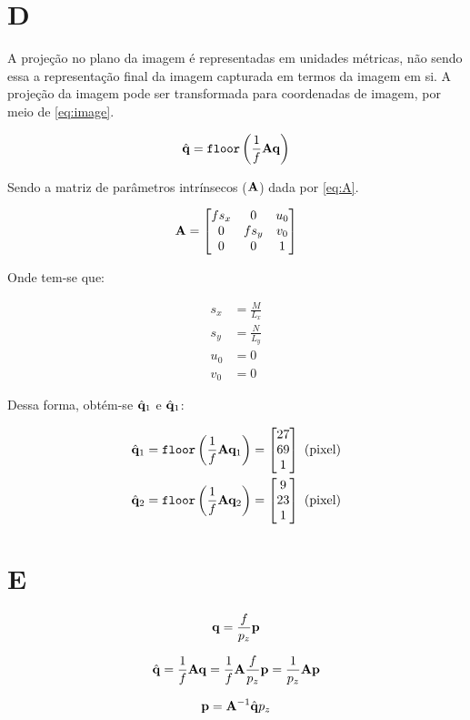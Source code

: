 \section{D}

A projeção no plano da imagem é representadas em unidades métricas, não sendo essa a representação final da imagem capturada em termos da imagem em si. A projeção da imagem pode ser transformada para coordenadas de imagem, por meio de \eqref{eq:image}.

\begin{equation}\label{eq:image}
	\hat{\mathbf{q}} = \texttt{floor}\left(\frac{1}{f}\mathbf{A}\mathbf{q}\right)
\end{equation}

Sendo a matriz de parâmetros intrínsecos ($\mathbf{A}$) dada por \eqref{eq:A}.

\begin{equation}\label{eq:A}
	\mathbf{A} = \begin{bmatrix}
		fs_x & 0 & u_0 \\
		0 & fs_y & v_0\\
		0 & 0 & 1
	\end{bmatrix}
\end{equation}

Onde tem-se que:

\begin{align}
	s_x &= \frac{M}{L_x} \\
	s_y &= \frac{N}{L_y} \\
	u_0 &= 0 \\
	v_0 &= 0 
\end{align}

Dessa forma, obtém-se $\hat{\mathbf{q}}_1$ e $\hat{\mathbf{q}}_1$:

\begin{align}
	\hat{\mathbf{q}}_1 &= \texttt{floor}\left(\frac{1}{f}\mathbf{A}\mathbf{q}_1\right) = \begin{bmatrix}
		27\\
		69\\
		1
	\end{bmatrix}  \text{ (pixel)}\\
	\hat{\mathbf{q}}_2 &= \texttt{floor}\left(\frac{1}{f}\mathbf{A}\mathbf{q}_2\right)  = \begin{bmatrix}
		9\\
		23\\
		1
	\end{bmatrix}  \text{ (pixel)}
\end{align}

\section{E}

\begin{equation}\label{key}
	\mathbf{q} = \frac{f}{p_z}\mathbf{p} 
\end{equation}

\begin{equation}\label{key}
	\hat{\mathbf{q}} = \frac{1}{f}\mathbf{A} \mathbf{q}  = \frac{1}{f}\mathbf{A}\frac{f}{p_z}\mathbf{p}  = \frac{1}{p_z}\mathbf{A}\mathbf{p} 
\end{equation}

\begin{equation}\label{key}
	\mathbf{p} = \mathbf{A}^{-1}\hat{\mathbf{q}}p_z
\end{equation}

